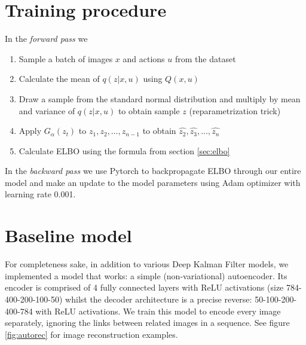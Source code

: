 \documentclass{article}
\begin{document}
\section{Training procedure}

In the \emph{forward pass} we 
\begin{enumerate}
    \item Sample a batch of images $x$ and actions $u$ from the dataset
    \item Calculate the mean of $q(z|x,u)$ using $Q(x,u)$
    \item Draw a sample from the standard normal distribution and multiply by mean and variance of $q(z|x,u)$ to obtain sample $z$ (reparametrization trick)
    \item Apply $G_{\alpha}(z_t)$ to $z_1,z_2,\dots,z_{n-1}$ to obtain $\hat{z_2},\hat{z_3},\dots,\hat{z_n}$
    \item Calculate ELBO using the formula from section \ref{sec:elbo}
\end{enumerate}

In the \emph{backward pass} we use Pytorch to backpropagate ELBO through our entire model and make an update to the model parameters using Adam optimizer with learning rate 0.001.

\section{Baseline model}

For completeness sake, in addition to various Deep Kalman Filter models, we implemented a model that works: a simple (non-variational) autoencoder. Its encoder is comprised of 4 fully connected layers with ReLU activations (size 784-400-200-100-50) whilst the decoder architecture is a precise reverse: 50-100-200-400-784 with ReLU activations. We train this model to encode every image separately, ignoring the links between related images in a sequence. See figure \ref{fig:autorec} for image reconstruction examples.
\end{document}
